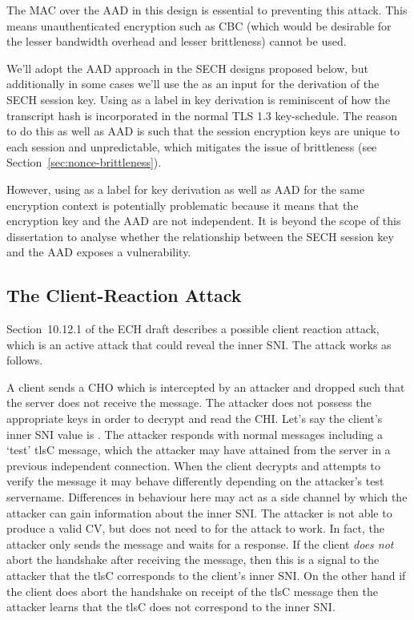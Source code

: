 The \ac{MAC} over the \ac{AAD} in this design is
essential to preventing this attack.
This means unauthenticated encryption
such as \ac{CBC}
(which would be desirable for the lesser bandwidth overhead and lesser \nonce brittleness)
cannot be used.

We'll adopt the \ac{AAD} approach in the \ac{SECH} designs proposed below,
but additionally in some cases we'll use the 
as an input for the derivation of the \ac{SECH} session key.
Using  as a label in key derivation is reminiscent of
how the transcript hash is incorporated in the normal \ac{TLS} 1.3
key-schedule.
The reason to do this as well as \ac{AAD} is such that the
session encryption keys are unique to each session and unpredictable,
which mitigates the issue of \nonce brittleness (see Section~\ref{sec:nonce-brittleness}).



However, using  as a label for key derivation as well as \ac{AAD}
for the same encryption context is potentially problematic because it means
that the encryption key and the \ac{AAD} are not independent.
It is beyond the scope of this dissertation to analyse whether the relationship
between the \ac{SECH} session key and the \ac{AAD} exposes a vulnerability. %

\subsection{The Client-Reaction Attack}

Section~10.12.1 of the \ac{ECH} draft describes a possible client reaction attack, which is
an active attack that could reveal the inner \ac{SNI}. The attack works as follows.

A client sends a \ac{CHO} which is intercepted by an attacker and dropped such that
the server does not receive the message.
The attacker does not possess the appropriate
keys in order to decrypt and read the \ac{CHI}. Let's say
the client's inner \ac{SNI} value is .
The attacker
responds with normal messages including a `test' \ac{tlsC} message,
which the attacker may have attained from the server
in a previous independent connection.
When the client decrypts and attempts to verify the  message
it may behave differently depending on the attacker's test servername.
Differences in behaviour here may act as a side channel by which the attacker can
gain information about the inner \ac{SNI}.
The attacker is not able to produce a valid \ac{CV}, but does not need to for the attack to work.
In fact, the attacker only sends the  message and waits for a response.
If the client {\em does not} abort
the handshake after receiving the  message, then
this is a signal to the attacker that
the \ac{tlsC} corresponds to the client's inner \ac{SNI}.
On the other hand if the client does
abort the handshake on receipt of the \ac{tlsC} message then
the attacker learns that the \ac{tlsC}
does not correspond to the inner \ac{SNI}.

